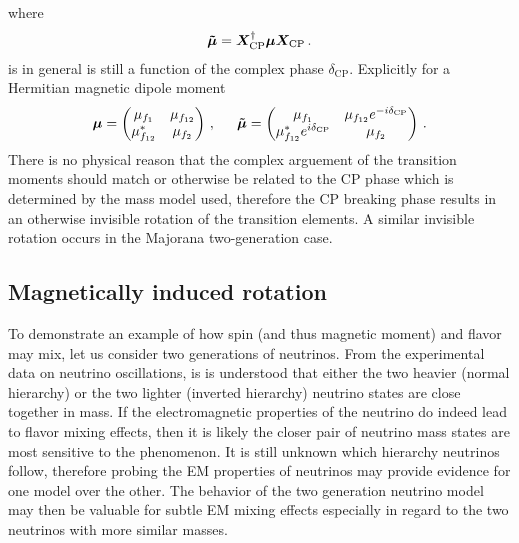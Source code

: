 where
\begin{alignat}{1}
	\label{cp:eq:06b} \boldsymbol{\tilde{\mu}}=\boldsymbol{X}_{\mathrm{CP}}^{\dagger}\boldsymbol{\mu}\boldsymbol{X}_{\mathrm{CP}}\,.
\end{alignat}
 is in general is still a function of the complex phase $\delta_{\mathrm{CP}}$. Explicitly for a Hermitian magnetic dipole moment
\begin{alignat}{1}
	\label{cp:eq:07a} \bb{\mu}=
	\begin{pmatrix}
		\mu_{f_{1}}&\mu_{f_{12}}\\
		\mu_{f_{12}}^{*}&\mu_{f_{2}}
	\end{pmatrix}\,,\indent \bb{\tilde{\mu}}=
	\begin{pmatrix}
		\mu_{f_{1}}&\mu_{f_{12}}e^{-i\delta_{\mathrm{CP}}}\\
		\mu_{f_{12}}^{*}e^{i\delta_{\mathrm{CP}}}&\mu_{f_{2}}
	\end{pmatrix}\,.
\end{alignat}
There is no physical reason that the complex arguement of the transition moments should match or otherwise be related to the CP phase which is determined by the mass model used, therefore the CP breaking phase results in an otherwise invisible rotation of the transition elements. A similar invisible rotation occurs in the Majorana two-generation case.
\subsection{Magnetically induced rotation}
\noindent To demonstrate an example of how spin (and thus magnetic moment) and flavor may mix, let us consider two generations of neutrinos. From the experimental data on neutrino oscillations, is is understood that either the two heavier (normal hierarchy) or the two lighter (inverted hierarchy) neutrino states are close together in mass. If the electromagnetic properties of the neutrino do indeed lead to flavor mixing effects, then it is likely the closer pair of neutrino mass states are most sensitive to the phenomenon. It is still unknown which hierarchy neutrinos follow, therefore probing the EM properties of neutrinos may provide evidence for one model over the other. The behavior of the two generation neutrino model may then be valuable for subtle EM mixing effects especially in regard to the two neutrinos with more similar masses.

